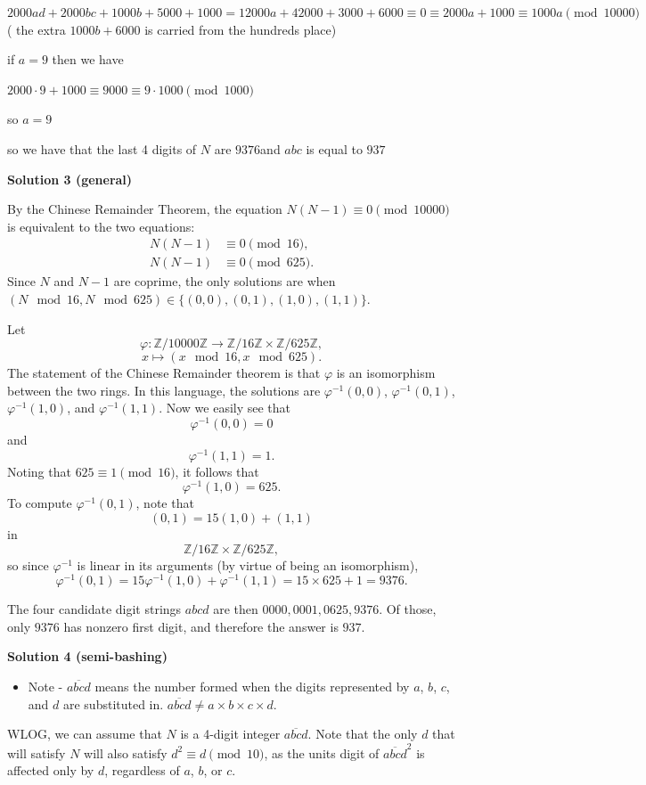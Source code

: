 \begin{enumerate}
 $2000ad+2000bc +1000b+5000+1000= 12000a+42000+ 3000+6000\equiv0\equiv 2000a+1000\equiv 1000a \pmod {10000}$( the extra $1000b+6000$ is carried from the hundreds place)

 if $a=9$ then we have 

 $2000 \cdot 9+1000 \equiv 9000\equiv9 \cdot 1000 \pmod {1000}$

 so $a=9$

 so we have that the last 4 digits of $N$ are $9376$and  $abc$ is equal to $\boxed{937}$




\textbf{Solution 3 (general)}

By the Chinese Remainder Theorem, the equation $N(N-1)\equiv 0\pmod{10000}$ is equivalent to the two equations:
 \begin{align*} N(N-1)&\equiv 0\pmod{16},\\ N(N-1)&\equiv 0\pmod{625}. \end{align*}
Since $N$ and $N-1$ are coprime, the only solutions are when $(N\mod{16},N\mod{625})\in\{(0,0),(0,1),(1,0),(1,1)\}$.

 Let 
 \[\varphi:\mathbb Z/10000\mathbb Z\to\mathbb Z/16\mathbb Z\times\mathbb Z/625\mathbb Z,\] 
 \[x\mapsto (x\mod{16},x\mod{625}).\] The statement of the Chinese Remainder theorem is that $\varphi$ is an isomorphism between the two rings. In this language, the solutions are $\varphi^{-1}(0,0)$, $\varphi^{-1}(0,1)$, $\varphi^{-1}(1,0)$, and $\varphi^{-1}(1,1)$. Now we easily see that 
 \[\varphi^{-1}(0,0)=0\] and 
 \[\varphi^{-1}(1,1)=1.\] Noting that $625\equiv 1\pmod{16}$, it follows that 
 \[\varphi^{-1}(1,0)=625.\] To compute $\varphi^{-1}(0,1)$, note that 
 \[(0,1)=15(1,0)+(1,1)\] in 
 \[\mathbb Z/16\mathbb Z\times\mathbb Z/625\mathbb Z,\] so since $\varphi^{-1}$ is linear in its arguments (by virtue of being an isomorphism), 
 \[\varphi^{-1}(0,1)=15\varphi^{-1}(1,0)+\varphi^{-1}(1,1)=15\times 625+1=9376.\]

 The four candidate digit strings $abcd$ are then $0000,0001,0625,9376$. Of those, only $9376$ has nonzero first digit, and therefore the answer is $\boxed{937}$.

 



\textbf{Solution 4 (semi-bashing)}


            \begin{itemize}
        \item Note - $\overline{abcd}$ means the number formed when the digits represented by $a$, $b$, $c$, and $d$ are substituted in. $\overline{abcd}\ne a\times b\times c\times d$.
            \end{itemize}
            WLOG, we can assume that $N$ is a 4-digit integer $\overline{abcd}$. Note that the only $d$ that will satisfy $N$ will also satisfy $d^2\equiv d\pmod{10}$, as the units digit of $\overline{abcd}^2$ is affected only by $d$, regardless of $a$, $b$, or $c$.


\end{enumerate}

